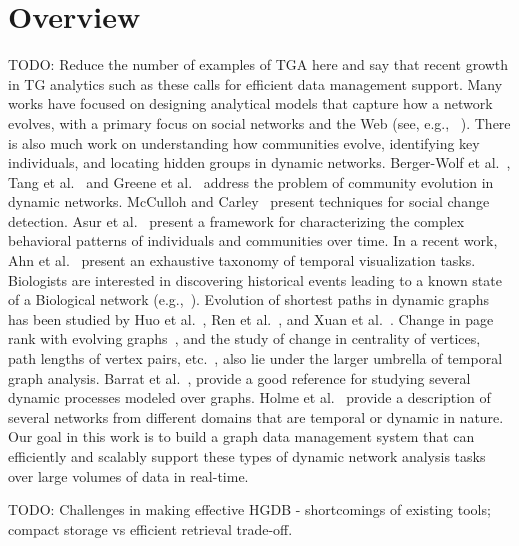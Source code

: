 \documentclass{svjour3}
\begin{document}
\section{Overview}
TODO: Reduce the number of examples of TGA here and say that recent growth in TG analytics such as these calls for efficient data management support. 
 Many works have
focused on designing analytical models that capture how a network evolves, with a primary focus on
social networks and the
Web (see, e.g., ~\cite{DBLP:series/ads/AggarwalW10a,LeskovecKF07,Kumar:2006:SEO:1150402.1150476}).
There is also much work on understanding how communities evolve, identifying key individuals,
and locating hidden groups in dynamic networks. Berger-Wolf et
al.~\cite{Berger-Wolf2006,Tantipathananandh2007},  
Tang et al.~\cite{Tang2008} and Greene et al.~\cite{Greene2010} 
address the problem of community evolution in
dynamic networks.
McCulloh and Carley~\cite{McCulloh2008} present techniques for social change detection.
Asur et al.~\cite{Asur2009} present a framework for characterizing the complex behavioral patterns
of individuals and communities over time. %
In a recent work, Ahn et al.~\cite{ahn2014task} present an exhaustive taxonomy of temporal
visualization tasks. Biologists are interested in discovering historical events leading to a 
known state of a Biological network (e.g.,~\cite{10.1371/journal.pcbi.1001119}).
Evolution of shortest paths in dynamic
graphs has been studied by Huo et al.~\cite{huo2014efficient}, Ren et al.~\cite{RenEvolvGraph11},
and Xuan et al.~\cite{xuan2003computing}. Change in page rank with evolving graphs~\cite{desikan2005incremental,bahmani2010fast}, and
the study of change in centrality of vertices, path lengths of vertex pairs,
etc.~\cite{pan2011path}, also lie under the larger umbrella of temporal graph analysis.
Barrat et al.~\cite{barrat2008dynamical}, provide a good reference for studying several
dynamic processes modeled over graphs. Holme et al.~\cite{holme2012temporal} provide a description of several networks from different domains that 
are temporal or dynamic in nature.
Our goal in this work is to build a graph data management system that can efficiently and scalably
support these types of dynamic network analysis tasks over large volumes of data in real-time.


TODO: Challenges in making effective HGDB - shortcomings of existing tools; compact storage vs efficient retrieval trade-off.
\end{document}
